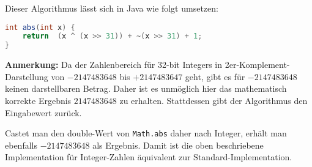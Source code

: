\documentclass[a4paper,10pt]{scrartcl}
\begin{document}
\begin{enumerate}
\begin{enumerate}
                Dieser Algorithmus lässt sich in Java wie folgt umsetzen:

            \begin{lstlisting}[language=java]
int abs(int x) {
    return  (x ^ (x >> 31)) + ~(x >> 31) + 1;
}
            \end{lstlisting}

                \textbf{Anmerkung:} Da der Zahlenbereich für 32-bit Integers in 2er-Komplement-Darstellung von
                $-2147483648$ bis $+2147483647$ geht, gibt es für $-2147483648$ keinen darstellbaren Betrag. Daher
                ist es unmöglich hier das mathematisch korrekte Ergebnis $2147483648$ zu erhalten. Stattdessen
                gibt der Algorithmus den Eingabewert zurück.

                Castet man den double-Wert von \lstinline|Math.abs| daher nach Integer, erhält
                man ebenfalls $-2147483648$ als Ergebnis. Damit ist die oben beschriebene Implementation
                für Integer-Zahlen äquivalent zur Standard-Implementation.
        \end{enumerate}
\end{enumerate}
\end{document}
